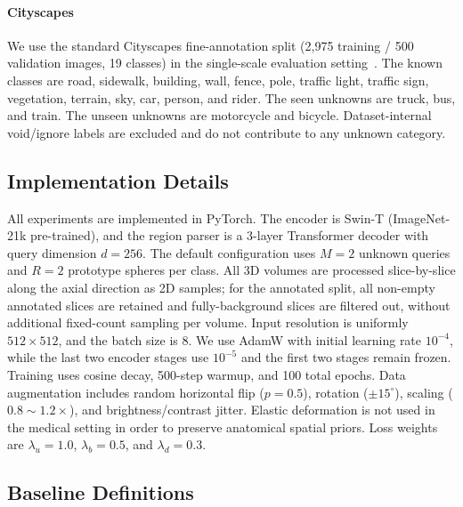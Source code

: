 \documentclass[11pt]{article}
\begin{document}
\paragraph{Cityscapes}
We use the standard Cityscapes fine-annotation split (2,975 training / 500 validation
images, 19 classes) in the single-scale evaluation setting~\cite{cordts2016cityscapes}.
The known classes are road, sidewalk, building, wall, fence, pole, traffic light,
traffic sign, vegetation, terrain, sky, car, person, and rider.
The seen unknowns are truck, bus, and train.
The unseen unknowns are motorcycle and bicycle.
Dataset-internal void/ignore labels are excluded and do not contribute to any unknown
category.

\subsection{Implementation Details}

All experiments are implemented in PyTorch.
The encoder is Swin-T (ImageNet-21k pre-trained), and the region parser is a 3-layer
Transformer decoder with query dimension $d=256$.
The default configuration uses $M=2$ unknown queries and $R=2$ prototype spheres per
class.
All 3D volumes are processed slice-by-slice along the axial direction as 2D samples;
for the annotated split, all non-empty annotated slices are retained and
fully-background slices are filtered out, without additional fixed-count sampling per
volume.
Input resolution is uniformly $512 \times 512$, and the batch size is 8.
We use AdamW with initial learning rate $10^{-4}$, while the last two encoder stages
use $10^{-5}$ and the first two stages remain frozen.
Training uses cosine decay, 500-step warmup, and 100 total epochs.
Data augmentation includes random horizontal flip ($p=0.5$), rotation ($\pm 15^\circ$),
scaling ($0.8 \sim 1.2\times$), and brightness/contrast jitter.
Elastic deformation is not used in the medical setting in order to preserve anatomical
spatial priors.
Loss weights are $\lambda_u = 1.0$, $\lambda_b = 0.5$, and $\lambda_d = 0.3$.

\subsection{Baseline Definitions}
\end{document}
